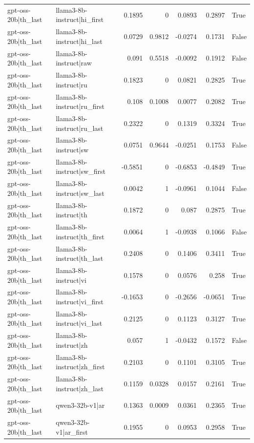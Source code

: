 \begin{table}
\begin{tabular}{l l r r r r l}
gpt-oss-20b|th_last & llama3-8b-instruct|hi_first & 0.1895 & 0 & 0.0893 & 0.2897 & True \\
gpt-oss-20b|th_last & llama3-8b-instruct|hi_last & 0.0729 & 0.9812 & -0.0274 & 0.1731 & False \\
gpt-oss-20b|th_last & llama3-8b-instruct|raw & 0.091 & 0.5518 & -0.0092 & 0.1912 & False \\
gpt-oss-20b|th_last & llama3-8b-instruct|ru & 0.1823 & 0 & 0.0821 & 0.2825 & True \\
gpt-oss-20b|th_last & llama3-8b-instruct|ru_first & 0.108 & 0.1008 & 0.0077 & 0.2082 & True \\
gpt-oss-20b|th_last & llama3-8b-instruct|ru_last & 0.2322 & 0 & 0.1319 & 0.3324 & True \\
gpt-oss-20b|th_last & llama3-8b-instruct|sw & 0.0751 & 0.9644 & -0.0251 & 0.1753 & False \\
gpt-oss-20b|th_last & llama3-8b-instruct|sw_first & -0.5851 & 0 & -0.6853 & -0.4849 & True \\
gpt-oss-20b|th_last & llama3-8b-instruct|sw_last & 0.0042 & 1 & -0.0961 & 0.1044 & False \\
gpt-oss-20b|th_last & llama3-8b-instruct|th & 0.1872 & 0 & 0.087 & 0.2875 & True \\
gpt-oss-20b|th_last & llama3-8b-instruct|th_first & 0.0064 & 1 & -0.0938 & 0.1066 & False \\
gpt-oss-20b|th_last & llama3-8b-instruct|th_last & 0.2408 & 0 & 0.1406 & 0.3411 & True \\
gpt-oss-20b|th_last & llama3-8b-instruct|vi & 0.1578 & 0 & 0.0576 & 0.258 & True \\
gpt-oss-20b|th_last & llama3-8b-instruct|vi_first & -0.1653 & 0 & -0.2656 & -0.0651 & True \\
gpt-oss-20b|th_last & llama3-8b-instruct|vi_last & 0.2125 & 0 & 0.1123 & 0.3127 & True \\
gpt-oss-20b|th_last & llama3-8b-instruct|zh & 0.057 & 1 & -0.0432 & 0.1572 & False \\
gpt-oss-20b|th_last & llama3-8b-instruct|zh_first & 0.2103 & 0 & 0.1101 & 0.3105 & True \\
gpt-oss-20b|th_last & llama3-8b-instruct|zh_last & 0.1159 & 0.0328 & 0.0157 & 0.2161 & True \\
gpt-oss-20b|th_last & qwen3-32b-v1|ar & 0.1363 & 0.0009 & 0.0361 & 0.2365 & True \\
gpt-oss-20b|th_last & qwen3-32b-v1|ar_first & 0.1955 & 0 & 0.0953 & 0.2958 & True \\

\end{tabular}
\end{table}
